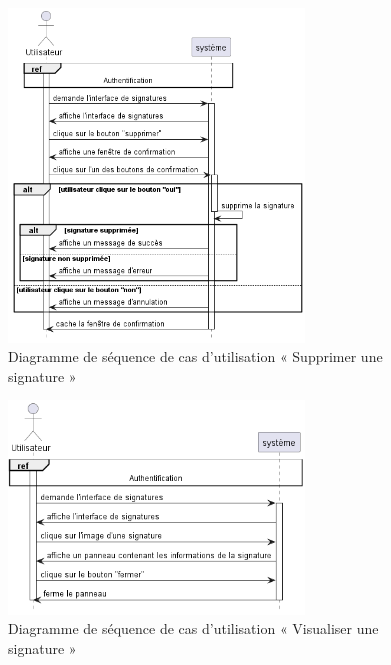 \begin{figure}[H]
  \centering
  \includegraphics[width=0.7\textwidth]{out/diagrams/signatures/delete/delete_signature}
  \caption{Diagramme de séquence de cas d'utilisation « Supprimer une signature  »}
  \label{fig:sequence_delete_signature}
\end{figure}

\begin{figure}[H]
  \centering
  \includegraphics[width=0.7\textwidth]{out/diagrams/signatures/view/view_signature}
  \caption{Diagramme de séquence de cas d'utilisation « Visualiser une signature  »}
  \label{fig:sequence_view_signature}
\end{figure}

